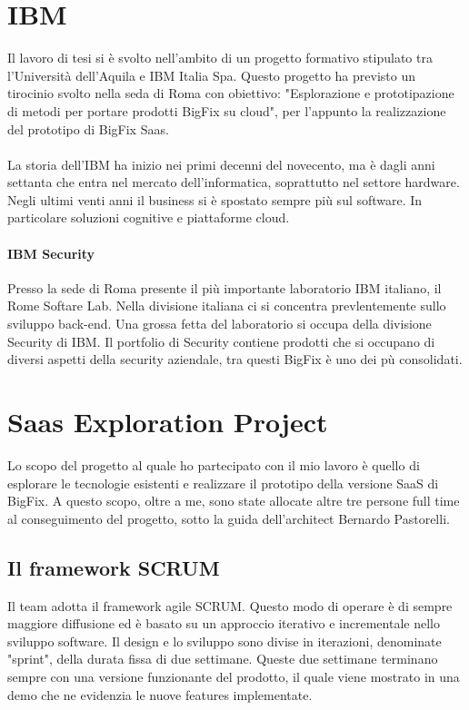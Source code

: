 \section{IBM}
Il lavoro di tesi si è svolto nell'ambito di un progetto formativo stipulato tra l'Università dell'Aquila e IBM Italia Spa. Questo progetto ha previsto un tirocinio svolto nella seda di Roma con obiettivo: "Esplorazione e prototipazione di metodi per portare prodotti BigFix su cloud", per l'appunto la realizzazione del prototipo di BigFix Saas. 
\paragraph{}
La storia dell'IBM ha inizio nei primi decenni del novecento, ma è dagli anni settanta che entra nel mercato dell'informatica, soprattutto nel settore hardware. Negli ultimi venti anni il business si è spostato sempre più sul software. In particolare soluzioni cognitive e piattaforme cloud.
\paragraph{IBM Security}
Presso la sede di Roma presente il più importante laboratorio IBM italiano, il Rome Softare Lab. Nella divisione italiana ci si concentra prevlentemente sullo sviluppo back-end. Una grossa fetta del laboratorio si occupa della divisione Security di IBM. Il portfolio di Security contiene prodotti che si occupano di diversi aspetti della security aziendale, tra questi BigFix è uno dei pù consolidati.

\section{Saas Exploration Project}
Lo scopo del progetto al quale ho partecipato con il mio lavoro è quello di esplorare le tecnologie esistenti e realizzare il prototipo della versione SaaS di BigFix. A questo scopo, oltre a me, sono state allocate altre tre persone full time al conseguimento del progetto, sotto la guida dell'architect Bernardo Pastorelli.
\subsection{Il framework SCRUM}
Il team adotta il framework agile SCRUM. Questo modo di operare è di sempre maggiore diffusione ed è basato su un approccio iterativo e incrementale nello sviluppo software. Il design e lo sviluppo sono divise in iterazioni, denominate "sprint", della durata fissa di due settimane. Queste due settimane terminano sempre con una versione funzionante del prodotto, il quale viene mostrato in una demo che ne evidenzia le nuove features implementate.
